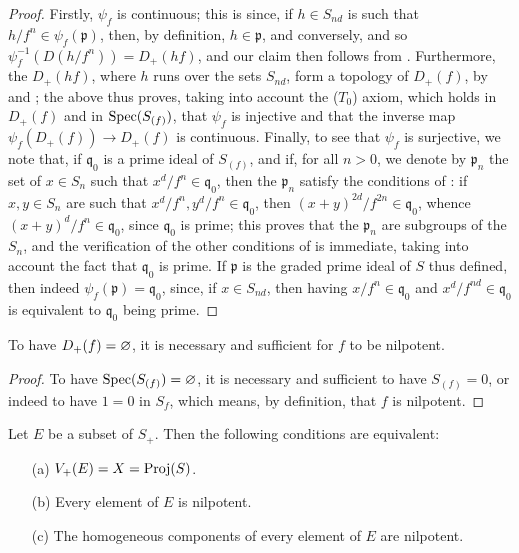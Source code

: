 \begin{proof}
Firstly, $\psi_f$ is continuous;
this is since, if $h\in S_{nd}$ is such that $h/f^n\in\psi_f(\mathfrak{p})$, then, by definition, $h\in\mathfrak{p}$, and conversely, and so $\psi_f^{-1}(D(h/f^n))=D_+(hf)$, and our claim then follows from .
Furthermore, the $D_+(hf)$, where $h$ runs over the sets $S_{nd}$, form a topology of $D_+(f)$, by  and ;
the
above thus proves, taking into account the ($T_0$) axiom, which holds in $D_+(f)$ and in $\operatorname{Spec}(S_{(f)})$, that $\psi_f$ is injective and that the inverse map $\psi_f(D_+(f))\to D_+(f)$ is continuous.
Finally, to see that $\psi_f$ is surjective, we note that, if $\mathfrak{q}_0$ is a prime ideal of $S_{(f)}$, and if, for all $n>0$, we denote by $\mathfrak{p}_n$ the set of $x\in S_n$ such that $x^d/f^n\in\mathfrak{q}_0$, then the $\mathfrak{p}_n$ satisfy the conditions of :
if $x,y\in S_n$ are such that $x^d/f^n,y^d/f^n\in\mathfrak{q}_0$, then $(x+y)^{2d}/f^{2n}\in\mathfrak{q}_0$, whence $(x+y)^d/f^n\in\mathfrak{q}_0$, since $\mathfrak{q}_0$ is prime;
this proves that the $\mathfrak{p}_n$ are subgroups of the $S_n$, and the verification of the other conditions of  is immediate, taking into account the fact that $\mathfrak{q}_0$ is prime.
If $\mathfrak{p}$ is the graded prime ideal of $S$ thus defined, then indeed $\psi_f(\mathfrak{p})=\mathfrak{q}_0$, since, if $x\in S_{nd}$, then having $x/f^n\in\mathfrak{q}_0$ and $x^d/f^{nd}\in\mathfrak{q}_0$ is equivalent to $\mathfrak{q}_0$ being prime.
\end{proof}

\begin{corollary}[2.3.7]
\label{II.2.3.7}
To have $D_+(f)=\varnothing$, it is necessary and sufficient for $f$ to be nilpotent.
\end{corollary}

\begin{proof}
To have $\operatorname{Spec}(S_{(f)})=\varnothing$, it is necessary and sufficient to have $S_{(f)}=0$, or indeed to have $1=0$ in $S_f$, which means, by definition, that $f$ is nilpotent.
\end{proof}

\begin{corollary}[2.3.8]
\label{II.2.3.8}
Let $E$ be a subset of $S_+$.
Then the following conditions are equivalent:
\begin{enumerate}
  \item[{\rm(a)}] $V_+(E) = X = \operatorname{Proj}(S)$.
  \item[{\rm(b)}] Every element of $E$ is nilpotent.
  \item[{\rm(c)}] The homogeneous components of every element of $E$ are nilpotent.
\end{enumerate}
\end{corollary}

